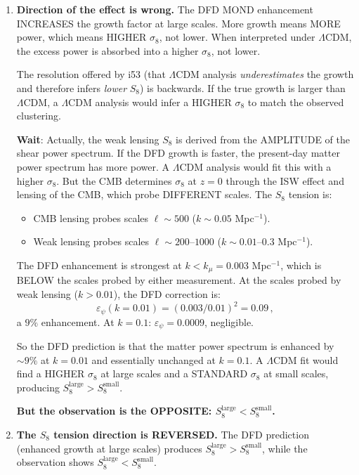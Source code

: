 \documentclass[11pt,a4paper]{article}
\begin{document}
\begin{enumerate}
\item \textbf{Direction of the effect is wrong.} The DFD MOND enhancement INCREASES the growth factor at large scales. More growth means MORE power, which means HIGHER $\sigma_8$, not lower. When interpreted under $\Lambda$CDM, the excess power is absorbed into a higher $\sigma_8$, not lower.

The resolution offered by i53 (that $\Lambda$CDM analysis \emph{underestimates} the growth and therefore infers \emph{lower} $S_8$) is backwards. If the true growth is larger than $\Lambda$CDM, a $\Lambda$CDM analysis would infer a HIGHER $\sigma_8$ to match the observed clustering.

\textbf{Wait}: Actually, the weak lensing $S_8$ is derived from the AMPLITUDE of the shear power spectrum. If the DFD growth is faster, the present-day matter power spectrum has more power. A $\Lambda$CDM analysis would fit this with a higher $\sigma_8$. But the CMB determines $\sigma_8$ at $z = 0$ through the ISW effect and lensing of the CMB, which probe DIFFERENT scales. The $S_8$ tension is:

\begin{itemize}
\item CMB lensing probes scales $\ell \sim 500$ ($k \sim 0.05$ Mpc$^{-1}$).
\item Weak lensing probes scales $\ell \sim 200$--$1000$ ($k \sim 0.01$--$0.3$ Mpc$^{-1}$).
\end{itemize}

The DFD enhancement is strongest at $k < k_\mu = 0.003$ Mpc$^{-1}$, which is BELOW the scales probed by either measurement. At the scales probed by weak lensing ($k > 0.01$), the DFD correction is:
\begin{equation}
\varepsilon_\psi(k = 0.01) = (0.003/0.01)^2 = 0.09\,,
\end{equation}
a $9\%$ enhancement. At $k = 0.1$: $\varepsilon_\psi = 0.0009$, negligible.

So the DFD prediction is that the matter power spectrum is enhanced by $\sim 9\%$ at $k = 0.01$ and essentially unchanged at $k = 0.1$. A $\Lambda$CDM fit would find a HIGHER $\sigma_8$ at large scales and a STANDARD $\sigma_8$ at small scales, producing $S_8^{\mathrm{large}} > S_8^{\mathrm{small}}$.

\textbf{But the observation is the OPPOSITE: $S_8^{\mathrm{large}} < S_8^{\mathrm{small}}$.}

\item \textbf{The $S_8$ tension direction is REVERSED.} The DFD prediction (enhanced growth at large scales) produces $S_8^{\mathrm{large}} > S_8^{\mathrm{small}}$, while the observation shows $S_8^{\mathrm{large}} < S_8^{\mathrm{small}}$.


\end{enumerate}
\end{document}
